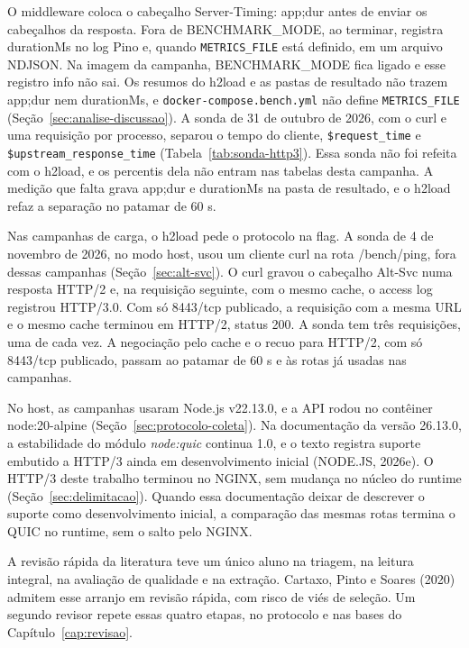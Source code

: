 O middleware coloca o cabeçalho Server-Timing: app;dur antes de enviar os cabeçalhos da resposta. Fora de BENCHMARK\_MODE, ao terminar, registra durationMs no log Pino e, quando \texttt{METRICS\_FILE} está definido, em um arquivo NDJSON. Na imagem da campanha, BENCHMARK\_MODE fica ligado e esse registro info não sai. Os resumos do h2load e as pastas de resultado não trazem app;dur nem durationMs, e \texttt{docker-compose.bench.yml} não define \texttt{METRICS\_FILE} (Seção~\ref{sec:analise-discussao}). A sonda de 31 de outubro de 2026, com o curl e uma requisição por processo, separou o tempo do cliente, \texttt{\$request\_time} e \texttt{\$upstream\_response\_time} (Tabela~\ref{tab:sonda-http3}). Essa sonda não foi refeita com o h2load, e os percentis dela não entram nas tabelas desta campanha. A medição que falta grava app;dur e durationMs na pasta de resultado, e o h2load refaz a separação no patamar de 60 s.

Nas campanhas de carga, o h2load pede o protocolo na flag. A sonda de 4 de novembro de 2026, no modo host, usou um cliente curl na rota /bench/ping, fora dessas campanhas (Seção~\ref{sec:alt-svc}). O curl gravou o cabeçalho Alt-Svc numa resposta HTTP/2 e, na requisição seguinte, com o mesmo cache, o access log registrou HTTP/3.0. Com só 8443/tcp publicado, a requisição com a mesma URL e o mesmo cache terminou em HTTP/2, status 200. A sonda tem três requisições, uma de cada vez. A negociação pelo cache e o recuo para HTTP/2, com só 8443/tcp publicado, passam ao patamar de 60 s e às rotas já usadas nas campanhas.

No host, as campanhas usaram Node.js v22.13.0, e a API rodou no contêiner node:20-alpine (Seção~\ref{sec:protocolo-coleta}). Na documentação da versão 26.13.0, a estabilidade do módulo \textit{node:quic} continua 1.0, e o texto registra suporte embutido a HTTP/3 ainda em desenvolvimento inicial (NODE.JS, 2026e). O HTTP/3 deste trabalho terminou no NGINX, sem mudança no núcleo do runtime (Seção~\ref{sec:delimitacao}). Quando essa documentação deixar de descrever o suporte como desenvolvimento inicial, a comparação das mesmas rotas termina o QUIC no runtime, sem o salto pelo NGINX.

A revisão rápida da literatura teve um único aluno na triagem, na leitura integral, na avaliação de qualidade e na extração. Cartaxo, Pinto e Soares (2020) admitem esse arranjo em revisão rápida, com risco de viés de seleção. Um segundo revisor repete essas quatro etapas, no protocolo e nas bases do Capítulo~\ref{cap:revisao}.


